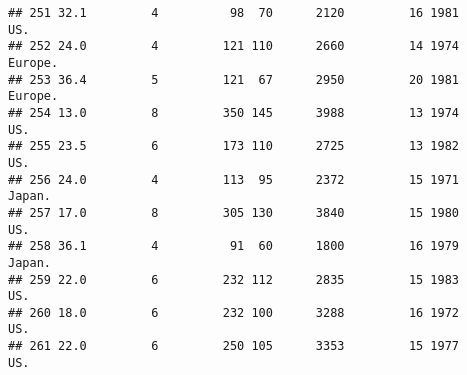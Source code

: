\documentclass[11pt,]{article}
\newenvironment{Shaded}{\begin{snugshade}}{\end{snugshade}}
\newcommand{\KeywordTok}[1]{\textcolor[rgb]{0.13,0.29,0.53}{\textbf{#1}}}
\newcommand{\NormalTok}[1]{#1}
\newcommand{\OperatorTok}[1]{\textcolor[rgb]{0.81,0.36,0.00}{\textbf{#1}}}
\begin{document}
\begin{verbatim}
## 251 32.1         4          98  70      2120         16 1981      US.
## 252 24.0         4         121 110      2660         14 1974  Europe.
## 253 36.4         5         121  67      2950         20 1981  Europe.
## 254 13.0         8         350 145      3988         13 1974      US.
## 255 23.5         6         173 110      2725         13 1982      US.
## 256 24.0         4         113  95      2372         15 1971   Japan.
## 257 17.0         8         305 130      3840         15 1980      US.
## 258 36.1         4          91  60      1800         16 1979   Japan.
## 259 22.0         6         232 112      2835         15 1983      US.
## 260 18.0         6         232 100      3288         16 1972      US.
## 261 22.0         6         250 105      3353         15 1977      US.
\end{verbatim}

\begin{Shaded}
\end{Shaded}
\end{document}
